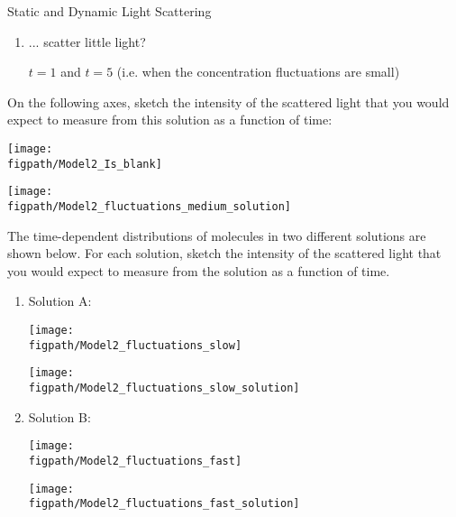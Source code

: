 \begin{activity}{Static and Dynamic Light Scattering}
\begin{ctqs}
\begin{enumerate}
				\begin{solution}[0.25in]{}
					$t=3$ and $t=7$ (i.e. when the concentration fluctuations are large)
				\end{solution}
			
			\item ... scatter little light?
			
				\begin{solution}[0.25in]{}
					$t=1$ and $t=5$ (i.e. when the concentration fluctuations are small)
				\end{solution}
				
		\end{enumerate}
		
		\clearpage
	\question On the following axes, sketch the intensity of the scattered light that you would expect to measure from this solution as a function of time:
	
		\vspace{6pt}
		\begin{solution}[0.75in]{\centerline{\texttt{[image: \\figpath/Model2\_Is\_blank]}}}
		\centerline{\texttt{[image: \\figpath/Model2\_fluctuations\_medium\_solution]}}
		\end{solution}
		\vspace{6pt}
		
	\question The time-dependent distributions of molecules in two different solutions are shown below.  For each solution, sketch the intensity of the scattered light that you would expect to measure from the solution as a function of time.
	
		\begin{enumerate}
			\item Solution A:
			
			\vspace{6pt}
			\begin{solution}[1.5in]{
			\centerline{\texttt{[image: \\figpath/Model2\_fluctuations\_slow]}}}
			\centerline{\texttt{[image: \\figpath/Model2\_fluctuations\_slow\_solution]}}
			\end{solution}
			\vspace{6pt}
			
			\item Solution B:
			
			\vspace{6pt}
			\begin{solution}[1.5in]{
			\centerline{\texttt{[image: \\figpath/Model2\_fluctuations\_fast]}}}
			\centerline{\texttt{[image: \\figpath/Model2\_fluctuations\_fast\_solution]}}
			\end{solution}
		\end{enumerate}
		

\end{ctqs}
\end{activity}
